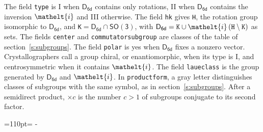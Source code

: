 \documentclass[10pt,a4paper]{article}
\newcommand{\needspace}[1]{\par\penalty-100\begingroup\dimen0=#1\relax\dimen2=\pagegoal
  \advance\dimen2-\pagetotal\ifdim\dimen0>\dimen2\relax\ifdim\dimen2>0pt\vfil\break\fi\fi
  \endgroup}
\numberwithin{equation}{section}
\newcommand{\eltfont}[1]{{\let\sigma\eltsigma\mathelt{#1}}}
\newcommand{\grp}[1]{\mathsf{#1}}
\newcommand{\elt}[1]{\eltfont{#1}}
\begin{document}
\leavevmode\label{n:element.inversion}The field \texttt{type} is I when $\grp{D_{6d}}$ contains only rotations, II when $\grp{D_{6d}}$ contains the inversion $\elt{i}$ and III otherwise. The field \texttt{hk} gives \texttt{H}, the rotation group isomorphic to $\grp{D_{6d}}$, and \texttt{K}${} = \grp{D_{6d}} \cap \grp{SO(3)}$, with $\grp{D_{6d}} = \texttt{K} \cup \elt{i}\,(\texttt{H} \setminus \texttt{K})$ as sets. The fields \texttt{center} and \texttt{commutatorsubgroup} are classes of the table of section~\ref{s:subgroups}. The field \texttt{polar} is yes when $\grp{D_{6d}}$ fixes a nonzero vector. Crystallographers call a group chiral, or enantiomorphic, when its type is I, and centrosymmetric when it contains $\elt{i}$. The field \texttt{laueclass} is the group generated by $\grp{D_{6d}}$ and $\elt{i}$.
In \texttt{productform}, a gray letter distinguishes classes of subgroups with the same symbol, as in section~\ref{s:subgroups}. \label{n:index.conjugates.c}After a semidirect product, ${\times}c$ is the number $c > 1$ of subgroups conjugate to its second factor.
\needspace{110pt}
\end{document}
